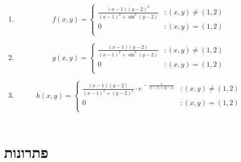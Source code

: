 \documentclass[12pt, a4paper]{article}
\begin{document}
\begin{enumerate}
\begin{enumerate}
\item 
\[
f(x, y) =
\begin{cases}
\frac{(x - 1)(y - 2)^2}{(x - 1)^2 + \sin^2(y - 2)} &: (x, y) \ne (1,2) \\
0 &: (x, y) = (1,2)\\
\end{cases}
\]
\item 
\[
g(x, y) =
\begin{cases}
\frac{(x - 1)(y - 2)}{(x - 1)^2 + \sin^2(y - 2)} &: (x, y) \ne (1,2) \\
0 &: (x, y) = (1,2)\\
\end{cases}
\]
\item 
$$h(x,y)=
\begin{cases}
    \frac{(x-1)(y-2)}{(x-1)^2+(y-2)^2}\cdot e^{\,-\frac{1}{|x-1|+|y-2|}}&:(x,y)\neq(1,2)\\
    0&:(x,y)=(1,2)\\
\end{cases}$$
\\
\end{enumerate}


\end{enumerate}


\section*{פתרונות}
\end{document}
